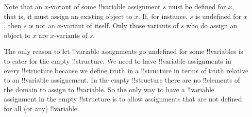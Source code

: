\documentclass[../../../include/open-logic-section]{subfiles}
\begin{document}
Note that an $x$-variant of some !!{variable} assignment $s$ must be 
defined for $x$, that is, it must assign an existing object to $x$. 
If, for instance, $s$ is undefined for $x$, then $s$ is not an $x$-variant
of itself. Only those variants of $s$ who do assign an object to $x$ 
are $x$-variants of $s$. 

\begin{explain}
The only reason to let !!{variable} assignments go undefined for some
!!{variable}s is to cater  for the empty !!{structure}. We need to have 
!!{variable} assignments in  every !!{structure} because we define 
truth in a !!{structure} in terms of truth relative to an !!{variable} assignement. In the 
empty !!{structure} there are no !!{element}s of the domain to assign 
to !!{variable}. So the only way to have a  !!{variable} assignment 
in the empty !!{structure} is to allow assignments
that are not defined for all (or any) !!{variable}.
\end{explain}
\end{document}
